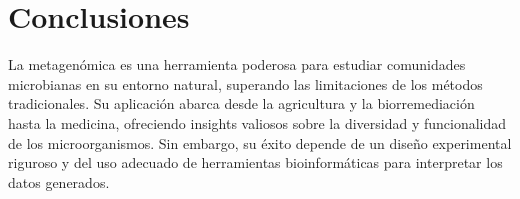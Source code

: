 \section{Conclusiones}
La metagenómica es una herramienta poderosa para estudiar comunidades microbianas en su entorno natural, superando las limitaciones de los métodos tradicionales. Su aplicación abarca desde la agricultura y la biorremediación hasta la medicina, ofreciendo insights valiosos sobre la diversidad y funcionalidad de los microorganismos. Sin embargo, su éxito depende de un diseño experimental riguroso y del uso adecuado de herramientas bioinformáticas para interpretar los datos generados.